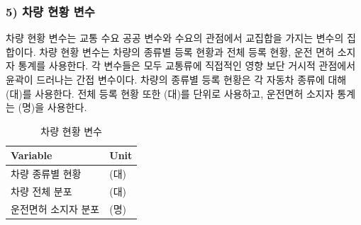 \documentclass[11pt]{report}
\begin{document}
\subsubsection*{5) 차량 현황 변수}
차량 현황 변수는 교통 수요 공공 변수와 수요의 관점에서 교집합을 가지는 변수의 집합이다. 
차량 현황 변수는 차량의 종류별 등록 현황과 전체 등록 현황, 운전 면허 소지자 통계를 사용한다. 
각 변수들은 모두 교통류에 직접적인 영향 보단 거시적 관점에서 윤곽이 드러나는 간접 변수이다. 
차량의 종류별 등록 현황은 각 자동차 종류에 대해 (대)를 사용한다. 
전체 등록 현황 또한 (대)를 단위로 사용하고, 운전면허 소지자 통계는 (명)을 사용한다.

\begin{table}[H]
	\begin{center}
	\vspace{0.5cm}
	\begin{tabular}{|l|l|}
		\hline
		\rowcolor[HTML]{C0C0C0} 
		Variable    & Unit \\ \hline
		차량 종류별 현황   & (대)  \\ \hline
		차량 전체 분포    & (대)  \\ \hline
		운전면허 소지자 분포 & (명)  \\ \hline
	\end{tabular}
	\end{center}
	\caption{차량 현황 변수}
	\label{tab:car_var}
\end{table}
\end{document}
